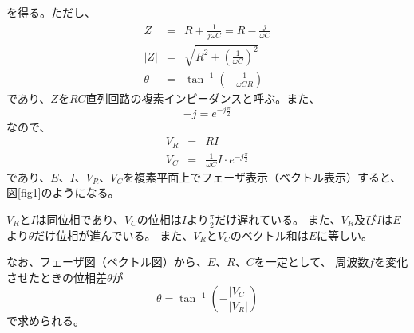 \documentclass[12pt]{jarticle}
\begin{document}
を得る。ただし、
\begin{eqnarray}
    Z&=&R+\frac{1}{j\omega C}=R-\frac{j}{\omega C} \label{eq9}\\
    |Z|&=&\sqrt{R^2+{\left(\frac{1}{\omega C}\right)}^2} \label{eq10}\\
    \theta&=&\tan^{-1}\left(-\frac{1}{\omega CR}\right) \label{eq11}
\end{eqnarray}
であり、$Z$を$RC$直列回路の複素インピーダンスと呼ぶ。また、
\begin{equation}
    -j=e^{-j\frac{\pi}{2}}
    \label{eq12}
\end{equation}
なので、
\begin{eqnarray}
    V_R&=&RI \label{eq13}\\
    V_C&=&\frac{1}{\omega C}I\cdot e^{-j\frac{\pi}{2}} \label{eq14}
\end{eqnarray}
であり、$E$、$I$、$V_R$、$V_C$を複素平面上でフェーザ表示（ベクトル表示）すると、
図\ref{fig1}のようになる。

$V_R$と$I$は同位相であり、$V_C$の位相は$I$より$\frac{\pi}{2}$だけ遅れている。
また、$V_R$及び$I$は$E$より$\theta$だけ位相が進んでいる。
また、$V_R$と$V_C$のベクトル和は$E$に等しい。

なお、フェーザ図（ベクトル図）から、$E$、$R$、$C$を一定として、
周波数$f$を変化させたときの位相差$\theta$が
\begin{equation}
    \theta=\tan^{-1}\left(-\frac{|V_C|}{|V_R|}\right)
    \label{eq15}
\end{equation}
で求められる。

\clearpage
\end{document}
